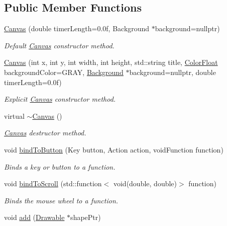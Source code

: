 \subsection*{Public Member Functions}
\begin{DoxyCompactItemize}
\item 
\hyperlink{classtsgl_1_1_canvas_a7954ec07ba18f72024b388cdba965015}{Canvas} (double timer\+Length=0.\+0f, Background $\ast$background=nullptr)
\begin{DoxyCompactList}\small\item\em Default \hyperlink{classtsgl_1_1_canvas}{Canvas} constructor method. \end{DoxyCompactList}\item 
\hyperlink{classtsgl_1_1_canvas_ae1b6c345bb9abbd46a11a6b30975711c}{Canvas} (int x, int y, int width, int height, std\+::string title, \hyperlink{structtsgl_1_1_color_float}{Color\+Float} background\+Color=G\+R\+AY, \hyperlink{classtsgl_1_1_background}{Background} $\ast$background=nullptr, double timer\+Length=0.\+0f)
\begin{DoxyCompactList}\small\item\em Explicit \hyperlink{classtsgl_1_1_canvas}{Canvas} constructor method. \end{DoxyCompactList}\item 
virtual \hyperlink{classtsgl_1_1_canvas_ab976c3999c68347818d64010b641e14f}{$\sim$\+Canvas} ()
\begin{DoxyCompactList}\small\item\em \hyperlink{classtsgl_1_1_canvas}{Canvas} destructor method. \end{DoxyCompactList}\item 
void \hyperlink{classtsgl_1_1_canvas_a26f2f1acf2b80eee95e42bc13dbc7600}{bind\+To\+Button} (Key button, Action action, void\+Function function)
\begin{DoxyCompactList}\small\item\em Binds a key or button to a function. \end{DoxyCompactList}\item 
void \hyperlink{classtsgl_1_1_canvas_aecd3d94790d2e660db380a5e951ae394}{bind\+To\+Scroll} (std\+::function$<$ void(double, double)$>$ function)
\begin{DoxyCompactList}\small\item\em Binds the mouse wheel to a function. \end{DoxyCompactList}\item 
void \hyperlink{classtsgl_1_1_canvas_ab8bc6862497ae8c93c03185e96c0ae9a}{add} (\hyperlink{classtsgl_1_1_drawable}{Drawable} $\ast$shape\+Ptr)

\end{DoxyCompactItemize}
